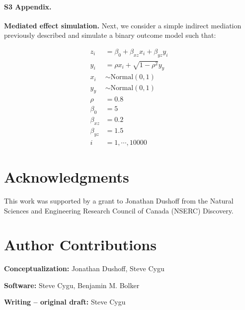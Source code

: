 \paragraph*{S3 Appendix.}
\label{S3_Appendix}
{\bf Mediated effect simulation.} Next, we consider a simple indirect mediation previously described and simulate a binary outcome model such that:

\begin{align}\label{sim:simple_mediate}
z_i &= \beta_0 + \beta_{xz} x_i + \beta_{yz} y_i \nonumber\\
y_i &= \rho x_i + \sqrt{1-\rho^2} y_y \nonumber\\
x_i &\sim \mathrm{Normal(0, 1)} \nonumber\\
y_y &\sim \mathrm{Normal(0, 1)} \nonumber\\
\rho &= 0.8 \nonumber\\
\beta_0 &= 5 \nonumber\\
\beta_{xz} &= 0.2 \nonumber\\
\beta_{yz} &= 1.5 \nonumber\\
i &= 1,\cdots, 10000
\end{align}


\section*{Acknowledgments}

This work was supported by a grant to Jonathan Dushoff from the Natural Sciences and Engineering Research Council of Canada (NSERC) Discovery.

\section*{Author Contributions}

\textbf{Conceptualization:} Jonathan Dushoff, Steve Cygu

\noindent\textbf{Software:} Steve Cygu, Benjamin M. Bolker

\noindent\textbf{Writing – original draft:} Steve Cygu

\nolinenumbers

